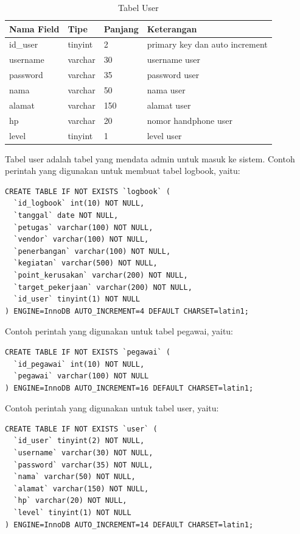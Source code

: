  \begin{table}[h]
\caption{Tabel User}
\centering
\begin{tabular}{ |p{2cm}|p{1cm}|p{1cm}|p{5cm}| }
 \hline
 \textbf{Nama Field} & \textbf{Tipe} & \textbf{Panjang} & \textbf{Keterangan}\\
 \hline
id\_user & tinyint & 2 & primary key dan auto increment\\
 \hline
username & varchar & 30 & username user\\
 \hline
password & varchar & 35 & password user\\
 \hline
nama & varchar & 50 & nama user\\
 \hline
alamat & varchar & 150 & alamat user\\
 \hline
hp & varchar & 20 & nomor handphone user\\
 \hline
level & tinyint & 1 & level user\\
 \hline
\end{tabular}
\end{table}
Tabel user adalah tabel yang mendata admin untuk masuk ke sistem.
Contoh perintah yang digunakan untuk membuat tabel logbook, yaitu:
\begin{lstlisting}
CREATE TABLE IF NOT EXISTS `logbook` (
  `id_logbook` int(10) NOT NULL,
  `tanggal` date NOT NULL,
  `petugas` varchar(100) NOT NULL,
  `vendor` varchar(100) NOT NULL,
  `penerbangan` varchar(100) NOT NULL,
  `kegiatan` varchar(500) NOT NULL,
  `point_kerusakan` varchar(200) NOT NULL,
  `target_pekerjaan` varchar(200) NOT NULL,
  `id_user` tinyint(1) NOT NULL
) ENGINE=InnoDB AUTO_INCREMENT=4 DEFAULT CHARSET=latin1;
\end{lstlisting}
Contoh perintah yang digunakan untuk tabel pegawai, yaitu:
\begin{lstlisting}
CREATE TABLE IF NOT EXISTS `pegawai` (
  `id_pegawai` int(10) NOT NULL,
  `pegawai` varchar(100) NOT NULL
) ENGINE=InnoDB AUTO_INCREMENT=16 DEFAULT CHARSET=latin1;
\end{lstlisting}
Contoh perintah yang digunakan untuk tabel user, yaitu:
\begin{lstlisting}
CREATE TABLE IF NOT EXISTS `user` (
  `id_user` tinyint(2) NOT NULL,
  `username` varchar(30) NOT NULL,
  `password` varchar(35) NOT NULL,
  `nama` varchar(50) NOT NULL,
  `alamat` varchar(150) NOT NULL,
  `hp` varchar(20) NOT NULL,
  `level` tinyint(1) NOT NULL
) ENGINE=InnoDB AUTO_INCREMENT=14 DEFAULT CHARSET=latin1;
\end{lstlisting}
